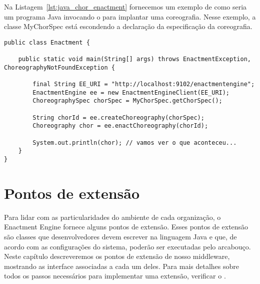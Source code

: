 Na Listagem~\ref{lst:java_chor_enactment} fornecemos um exemplo de como seria
um programa Java invocando o \ee para implantar uma coreografia.
Nesse exemplo, a classe \textsf{MyChorSpec} está escondendo a declaração
da especificação da coreografia.

\begin{lstlisting}[breaklines, caption={Programa Java que invoca o \ee para implantar uma coreografia.}, label={lst:java_chor_enactment}]
public class Enactment {

    public static void main(String[] args) throws EnactmentException, ChoreographyNotFoundException {

        final String EE_URI = "http://localhost:9102/enactmentengine";
        EnactmentEngine ee = new EnactmentEngineClient(EE_URI);
        ChoreographySpec chorSpec = MyChorSpec.getChorSpec();

        String chorId = ee.createChoreography(chorSpec);
        Choreography chor = ee.enactChoreography(chorId);

        System.out.println(chor); // vamos ver o que aconteceu...
    }
}
\end{lstlisting}


\section{Pontos de extensão}
\label{sec:extensao}

Para lidar com as particularidades do ambiente de cada organização, o Enactment Engine fornece alguns pontos de extensão. Esses pontos de extensão são classes que desenvolvedores devem escrever na linguagem Java e que, de acordo com as configurações do sistema, poderão ser executadas pelo arcabouço.
Neste capítulo descreveremos os pontos de extensão de nosso middleware, 
mostrando as interface associadas a cada um deles.
Para mais detalhes sobre todos os passos necessários para implementar
uma extensão, verificar o \userguide.


